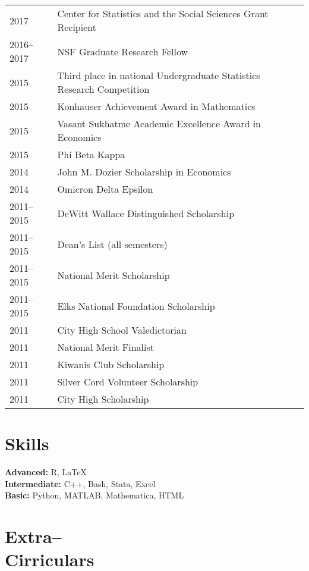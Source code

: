 \documentclass[margin,centered]{res}
\begin{document}
\begin{resume}
\begin{tabular}{@{}p{0.8in}p{4in}}
2017 & Center for Statistics and the Social Sciences Grant Recipient\\
2016--2017 & NSF Graduate Research Fellow\\
2015 & Third place in national Undergraduate Statistics Research Competition\\
2015 & Konhauser Achievement Award in Mathematics\\
2015 & Vasant Sukhatme Academic Excellence Award in Economics \\
2015 & Phi Beta Kappa\\
2014 & John M. Dozier Scholarship in Economics \\
2014 & Omicron Delta Epsilon\\
2011--2015 & DeWitt Wallace Distinguished Scholarship \\
2011--2015 & Dean's List (all semesters)\\
2011--2015 & National Merit Scholarship \\
2011--2015 & Elks National Foundation Scholarship\\
2011 & City High School Valedictorian\\
2011 & National Merit Finalist\\
2011 & Kiwanis Club Scholarship \\
2011 & Silver Cord Volunteer Scholarship\\
2011 & City High Scholarship\\
\end{tabular}





\section{\sc Skills}
{\bf Advanced:} R, LaTeX\\
{\bf Intermediate:} C++, Bash, Stata, Excel\\
{\bf Basic:} Python, MATLAB, Mathematica, HTML



\section{\sc Extra-- \\ Cirriculars} 





\end{resume}
\end{document}

